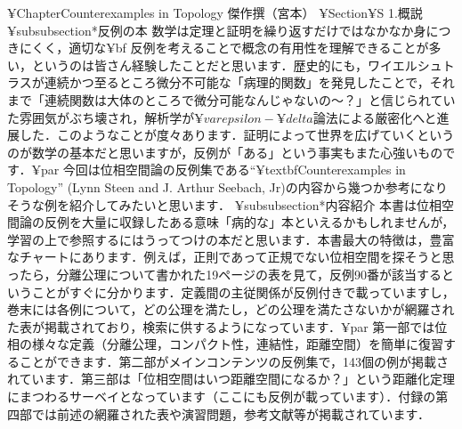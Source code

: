 ¥Chapter{Counterexamples in Topology 傑作撰（宮本）}
¥Section{¥S 1.概説}
¥subsubsection*{反例の本}
数学は定理と証明を繰り返すだけではなかなか身につきにくく，適切な{¥bf 反例}を考えることで概念の有用性を理解できることが多い，というのは皆さん経験したことだと思います．歴史的にも，ワイエルシュトラスが連続かつ至るところ微分不可能な「病理的関数」を発見したことで，それまで「連続関数は大体のところで微分可能なんじゃないの〜？」と信じられていた雰囲気がぶち壊され，解析学が$¥varepsilon - ¥delta$論法による厳密化へと進展した．このようなことが度々あります．証明によって世界を広げていくというのが数学の基本だと思いますが，反例が「ある」という事実もまた心強いものです．¥par
今回は位相空間論の反例集である``¥textbf{Counterexamples in Topology}''  (Lynn Steen and J. Arthur Seebach, Jr)の内容から幾つか参考になりそうな例を紹介してみたいと思います．
¥subsubsection*{内容紹介}
本書は位相空間論の反例を大量に収録したある意味「病的な」本といえるかもしれませんが，学習の上で参照するにはうってつけの本だと思います．本書最大の特徴は，豊富なチャートにあります．例えば，正則であって正規でない位相空間を探そうと思ったら，分離公理について書かれた19ページの表を見て，反例90番が該当するということがすぐに分かります．定義間の主従関係が反例付きで載っていますし，巻末には各例について，どの公理を満たし，どの公理を満たさないかが網羅された表が掲載されており，検索に供するようになっています．¥par
第一部では位相の様々な定義（分離公理，コンパクト性，連結性，距離空間）を簡単に復習することができます．第二部がメインコンテンツの反例集で，143個の例が掲載されています．第三部は「位相空間はいつ距離空間になるか？」という距離化定理にまつわるサーベイとなっています（ここにも反例が載っています）．付録の第四部では前述の網羅された表や演習問題，参考文献等が掲載されています．

